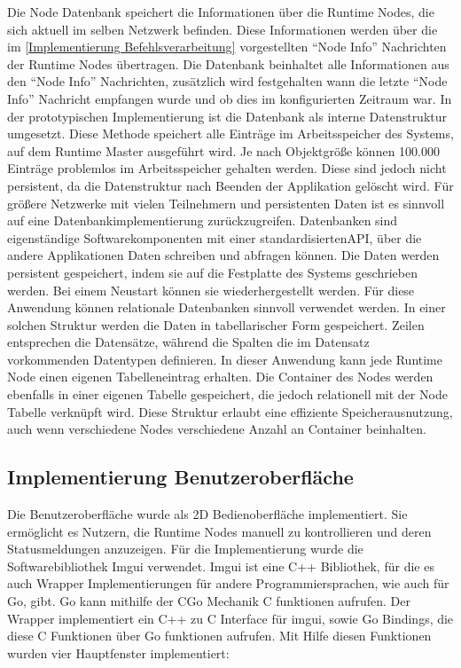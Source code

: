 Die Node Datenbank speichert die Informationen über die Runtime Nodes, die sich aktuell im selben Netzwerk befinden. Diese Informationen werden über die im \autoref{Implementierung Befehlsverarbeitung} vorgestellten \enquote{Node Info} Nachrichten der Runtime Nodes übertragen. Die Datenbank beinhaltet alle Informationen aus den \enquote{Node Info} Nachrichten, zusätzlich wird festgehalten wann die letzte \enquote{Node Info} Nachricht empfangen wurde und ob dies im konfigurierten Zeitraum war. In der prototypischen Implementierung ist die Datenbank als interne Datenstruktur umgesetzt. Diese Methode speichert alle Einträge im Arbeitsspeicher des Systems, auf dem Runtime Master ausgeführt wird. Je nach Objektgröße können 100.000 Einträge problemlos im Arbeitsspeicher gehalten werden. Diese sind jedoch nicht persistent, da die Datenstruktur nach Beenden der Applikation gelöscht wird. Für größere Netzwerke mit vielen Teilnehmern und persistenten Daten ist es sinnvoll auf eine Datenbankimplementierung zurückzugreifen. Datenbanken sind eigenständige Softwarekomponenten mit einer standardisierten\gls{API}, über die andere Applikationen Daten schreiben und abfragen können. Die Daten werden persistent gespeichert, indem sie auf die Festplatte des Systems geschrieben werden. Bei einem Neustart können sie wiederhergestellt werden. Für diese Anwendung können relationale Datenbanken sinnvoll verwendet werden. In einer solchen Struktur werden die Daten in tabellarischer Form gespeichert. Zeilen entsprechen die Datensätze, während die Spalten die im Datensatz vorkommenden Datentypen definieren. In dieser Anwendung kann jede Runtime Node einen eigenen Tabelleneintrag erhalten. Die Container des Nodes werden ebenfalls in einer eigenen Tabelle gespeichert, die jedoch relationell mit der Node Tabelle verknüpft wird. Diese Struktur erlaubt eine effiziente Speicherausnutzung, auch wenn verschiedene Nodes verschiedene Anzahl an Container beinhalten. 

\subsection{Implementierung Benutzeroberfläche}

Die Benutzeroberfläche wurde als 2D Bedienoberfläche implementiert. Sie ermöglicht es Nutzern, die Runtime Nodes manuell zu kontrollieren und deren Statusmeldungen anzuzeigen. Für die Implementierung wurde die Softwarebibliothek Imgui verwendet. Imgui ist eine C++ Bibliothek, für die es auch Wrapper Implementierungen für andere Programmiersprachen, wie auch für Go, gibt. Go kann mithilfe der CGo Mechanik C funktionen aufrufen. Der Wrapper implementiert ein C++ zu C Interface für imgui, sowie Go Bindings, die diese C Funktionen über Go funktionen aufrufen. Mit Hilfe diesen Funktionen wurden vier Hauptfenster implementiert: 

